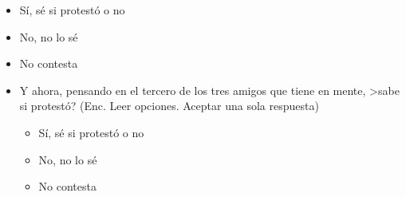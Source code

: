 \documentclass[12pt]{article}
\begin{document}
\begin{enumerate}
\begin{itemize}
\begin{itemize}
\item S\'{i}, s\'{e} si protest\'{o} o no
\item No, no lo s\'{e}
\item No contesta
\end{itemize}
\end{itemize}
\begin{itemize}
\item Y ahora, pensando en el tercero de los tres amigos que tiene en mente, >sabe si protest\'{o}? (Enc. Leer opciones. Aceptar una sola respuesta)
\begin{itemize}
\item S\'{i}, s\'{e} si protest\'{o} o no
\item No, no lo s\'{e}
\item No contesta
\end{itemize}
\end{itemize}
\end{enumerate}
\end{document}
